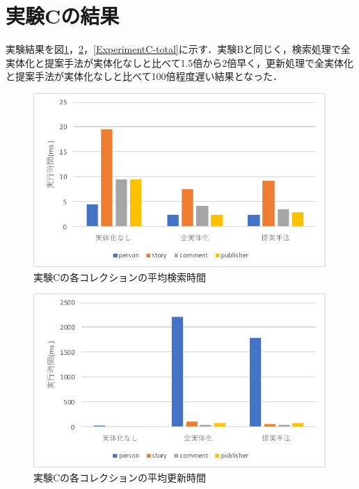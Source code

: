 \documentclass[a4paper,11pt]{ujreport}
\begin{document}
\section{実験Cの結果}
実験結果を図\ref{ExperimentC-find}，\ref{ExperimentC-update}，\ref{ExperimentC-total}に示す．実験Bと同じく，検索処理で全実体化と提案手法が実体化なしと比べて1.5倍から2倍早く，更新処理で全実体化と提案手法が実体化なしと比べて100倍程度遅い結果となった．
\begin{figure}[htbp]
	\begin{center}
		\includegraphics[width=30em]{src/ExperimentC-find.pdf} %
	\end{center}
	\caption{実験Cの各コレクションの平均検索時間}
	\label{ExperimentC-find}
\end{figure}
\begin{figure}[htbp]
	\begin{center}
		\includegraphics[width=30em]{src/ExperimentC-update.pdf} %
	\end{center}
	\caption{実験Cの各コレクションの平均更新時間}
	\label{ExperimentC-update}
\end{figure}
\end{document}
